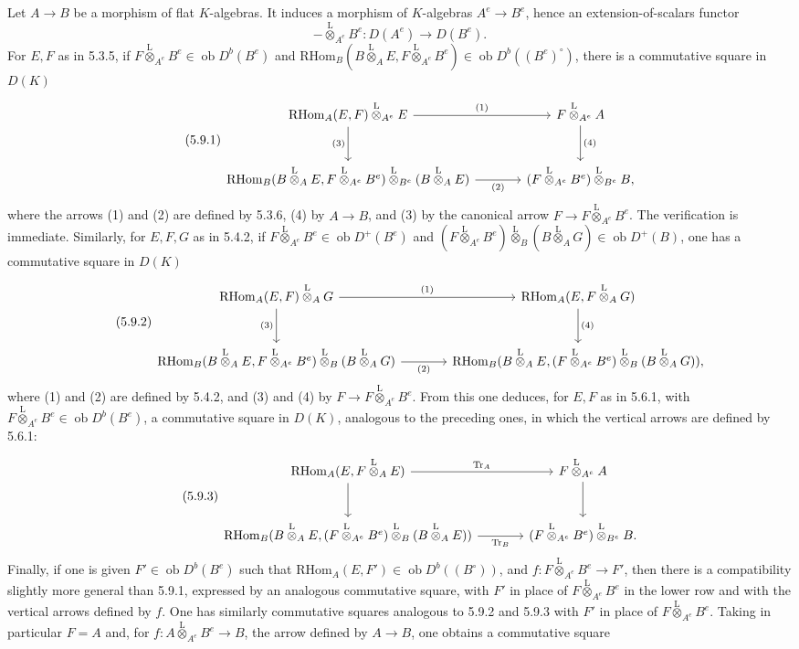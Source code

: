 \documentclass[11pt]{article}
\newcommand{\ob}{\operatorname{ob}}
\providecommand{\RHom}{\mathrm{RHom}}
\providecommand{\Tr}{\operatorname{Tr}}
\providecommand{\Tr}{\operatorname{Tr}}
\providecommand{\lten}{\overset{\mathrm L}{\otimes}}
\providecommand{\Tr}{\operatorname{Tr}}
\providecommand{\RHom}{\mathrm{RHom}}
\providecommand{\ob}{\operatorname{ob}}
\providecommand{\lten}{\overset{\mathrm L}{\otimes}}
\providecommand{\RHom}{\mathrm R\mathcal{H}om}
\providecommand{\lten}{\overset{\mathrm L}{\otimes}}
\providecommand{\Tr}{\operatorname{Tr}}
\providecommand{\lten}{\overset{\mathrm L}{\otimes}}
\providecommand{\lten}{\overset{\mathrm L}{\otimes}}
\providecommand{\lten}{\overset{\mathrm L}{\otimes}}
\providecommand{\RHom}{\mathrm{RHom}}
\begin{document}
Let $A\to B$ be a morphism of flat $K$-algebras. It induces a morphism of $K$-algebras $A^e\to B^e$, hence an extension-of-scalars functor
\[
-\lten_{A^e}B^e:D(A^e)\longrightarrow D(B^e).
\]
For $E,F$ as in 5.3.5, if $F\lten_{A^e}B^e\in\ob D^b(B^e)$ and $\RHom_B(B\lten_AE,F\lten_{A^e}B^e)\in\ob D^b((B^e)^\circ)$, there is a commutative square in $D(K)$
\begin{equation}\tag{5.9.1}
\begin{tikzcd}[column sep=large,row sep=large]
\RHom_A(E,F)\lten_{A^e}E \arrow[r,"(1)"] \arrow[d,"(3)"'] & F\lten_{A^e}A \arrow[d,"(4)"]\\
\RHom_B(B\lten_AE,F\lten_{A^e}B^e)\lten_{B^e}(B\lten_AE) \arrow[r,"(2)"'] & (F\lten_{A^e}B^e)\lten_{B^e}B,
\end{tikzcd}
\end{equation}
where the arrows (1) and (2) are defined by 5.3.6, (4) by $A\to B$, and (3) by the canonical arrow $F\to F\lten_{A^e}B^e$. The verification is immediate. Similarly, for $E,F,G$ as in 5.4.2, if $F\lten_{A^e}B^e\in\ob D^+(B^e)$ and $(F\lten_{A^e}B^e)\lten_B(B\lten_AG)\in\ob D^+(B)$, one has a commutative square in $D(K)$
\begin{equation}\tag{5.9.2}
\begin{tikzcd}[column sep=large,row sep=large]
\RHom_A(E,F)\lten_AG \arrow[r,"(1)"] \arrow[d,"(3)"'] & \RHom_A(E,F\lten_AG) \arrow[d,"(4)"]\\
\RHom_B(B\lten_AE,F\lten_{A^e}B^e)\lten_B(B\lten_AG) \arrow[r,"(2)"'] & \RHom_B(B\lten_AE,(F\lten_{A^e}B^e)\lten_B(B\lten_AG)),
\end{tikzcd}
\end{equation}
where (1) and (2) are defined by 5.4.2, and (3) and (4) by $F\to F\lten_{A^e}B^e$. From this one deduces, for $E,F$ as in 5.6.1, with $F\lten_{A^e}B^e\in\ob D^b(B^e)$, a commutative square in $D(K)$, analogous to the preceding ones, in which the vertical arrows are defined by 5.6.1:
\begin{equation}\tag{5.9.3}
\begin{tikzcd}[column sep=large,row sep=large]
\RHom_A(E,F\lten_AE) \arrow[r,"\Tr_A"] \arrow[d] & F\lten_{A^e}A \arrow[d]\\
\RHom_B(B\lten_AE,(F\lten_{A^e}B^e)\lten_B(B\lten_AE)) \arrow[r,"\Tr_B"'] & (F\lten_{A^e}B^e)\lten_{B^e}B.
\end{tikzcd}
\end{equation}
Finally, if one is given $F'\in\ob D^b(B^e)$ such that $\RHom_A(E,F')\in\ob D^b((B^\circ))$, and $f:F\lten_{A^e}B^e\to F'$, then there is a compatibility slightly more general than 5.9.1, expressed by an analogous commutative square, with $F'$ in place of $F\lten_{A^e}B^e$ in the lower row and with the vertical arrows defined by $f$. One has similarly commutative squares analogous to 5.9.2 and 5.9.3 with $F'$ in place of $F\lten_{A^e}B^e$. Taking in particular $F=A$ and, for $f:A\lten_{A^e}B^e\to B$, the arrow defined by $A\to B$, one obtains a commutative square
\end{document}
